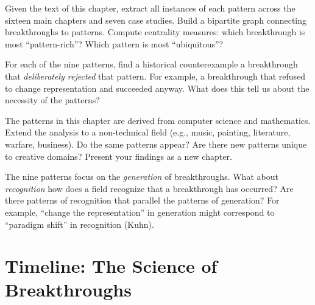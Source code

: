 \begin{exercise}[Computational]
Given the text of this chapter, extract all instances of each pattern across the sixteen main chapters and seven case studies. Build a bipartite graph connecting breakthroughs to patterns. Compute centrality measures: which breakthrough is most ``pattern-rich''? Which pattern is most ``ubiquitous''?
\end{exercise}

\begin{exercise}[Research]
For each of the nine patterns, find a historical counterexample a breakthrough that \emph{deliberately rejected} that pattern. For example, a breakthrough that refused to change representation and succeeded anyway. What does this tell us about the necessity of the patterns?
\end{exercise}

\begin{exercise}[Research]
The patterns in this chapter are derived from computer science and mathematics. Extend the analysis to a non-technical field (e.g., music, painting, literature, warfare, business). Do the same patterns appear? Are there new patterns unique to creative domains? Present your findings as a new chapter.
\end{exercise}

\begin{exercise}[Research]
The nine patterns focus on the \emph{generation} of breakthroughs. What about \emph{recognition} how does a field recognize that a breakthrough has occurred? Are there patterns of recognition that parallel the patterns of generation? For example, ``change the representation'' in generation might correspond to ``paradigm shift'' in recognition (Kuhn).
\end{exercise}

\section{Timeline: The Science of Breakthroughs}
\label{sec:anatomy:timeline}

